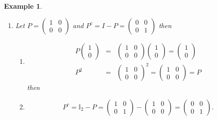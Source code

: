 \documentclass[aps,preprint]{revtex4}
\newtheorem{example}[theorem]{Example}
\begin{document}
\begin{example}
\begin{enumerate}
\item Let $P=\left( 
\begin{array}{cc}
1 & 0 \\ 
0 & 0%
\end{array}%
\right) $ and $P^{c}=I-P=\left( 
\begin{array}{cc}
0 & 0 \\ 
0 & 1%
\end{array}%
\right) $ then

\begin{enumerate}
\item 
\begin{eqnarray}
P\left( 
\begin{array}{c}
1 \\ 
0%
\end{array}%
\right) &=&\left( 
\begin{array}{cc}
1 & 0 \\ 
0 & 0%
\end{array}%
\right) \left( 
\begin{array}{c}
1 \\ 
0%
\end{array}%
\right) =\left( 
\begin{array}{c}
1 \\ 
0%
\end{array}%
\right) \\
P^{2} &=&\left( 
\begin{array}{cc}
1 & 0 \\ 
0 & 0%
\end{array}%
\right) ^{2}=\left( 
\begin{array}{cc}
1 & 0 \\ 
0 & 0%
\end{array}%
\right) =P
\end{eqnarray}%
then

\item 
\begin{equation}
P^{c}=\mathbb{I}_{2}-P=\left( 
\begin{array}{cc}
1 & 0 \\ 
0 & 1%
\end{array}%
\right) -\left( 
\begin{array}{cc}
1 & 0 \\ 
0 & 0%
\end{array}%
\right) =\left( 
\begin{array}{cc}
0 & 0 \\ 
0 & 1%
\end{array}%
\right) .
\end{equation}


\end{enumerate}
\end{enumerate}
\end{example}
\end{document}
